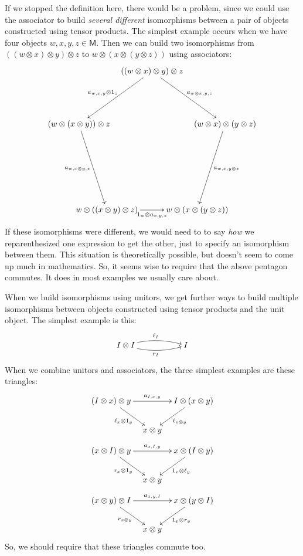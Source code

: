 \documentclass[reqno]{amsart}
\newcommand{\M}{{\mathsf{M}}}   %
\theoremstyle{definition}
\newcommand{\be}{\begin{equation}}
\newcommand{\ee}{\end{equation}}
\begin{document}
If we stopped the definition here, there would be a problem, since we could
use the associator to build \emph{several different} isomorphisms
between a pair of objects constructed using tensor products.  The simplest
example occurs when we have four objects $w,x,y,z \in \M$.  Then we can
build two isomorphisms from $((w \otimes x) \otimes y) \otimes z$ to $w \otimes (x \otimes (y \otimes z))$ using associators:
\be
\xy 0;/r.3pc/:
    (-24.73,8.03)*+{ (w \otimes (x \otimes y)) \otimes z}="l";
    (0,26)*+{ ((w \otimes x) \otimes y) \otimes z}="t";
    (24.73,8.03)*+{ (w \otimes x) \otimes (y \otimes z)}="r";
    (15.28,-21.03)*+{ w \otimes (x \otimes (y \otimes z))}="br";
    (-15.28,-21.03)*+{ w \otimes ((x \otimes y) \otimes z)}="bl";
     {\ar_{a_{w, x, y} \otimes 1_z} "t";"l"};
     {\ar_{a_{w, x \otimes y, z}} "l";"bl"};
     {\ar_{1_w \otimes a_{x,y,z}} "bl";"br"};
     {\ar^{a_{w, x, y \otimes z}} "r";"br"};
     {\ar^{a_{w \otimes x, y, z}} "t";"r"};
\endxy
\label{pentagon}
\ee
If these isomorphisms were different, we would need to to say \emph{how} we reparenthesized one expression to get the other, just to specify an isomorphism between them.  This situation is theoretically possible, but doesn't seem to come up much in mathematics.   So, it seems wise to require that the above pentagon commutes.  It does in most examples we usually care about.

When we build isomorphisms using unitors, we get further
ways to build multiple isomorphisms between objects constructed using tensor products and the unit object.  The simplest example is this:
\be 
\xymatrix{
I \otimes I   \ar@/^/[rr]^{\ell_I}  \ar@/_/[rr]_{r_I} && I
}  
\label{bigon}
\ee
When we combine unitors and associators, the three simplest examples are these triangles:
\be
\xy 0;/r.3pc/:
(-14,10)*+{(I \otimes x) \otimes y}="l";
(14,10)*+{ I \otimes (x \otimes y)}="r";
(0,0)*+{x \otimes y }="b";
 {\ar^{a_{I,x,y}} "l";"r"};
{\ar_{\ell_x \otimes 1_y} "l";"b"};
{\ar^{\ell_{x \otimes y}} "r";"b"};
\endxy    
\label{triangle1}
\ee
\be
\xy 0;/r.3pc/:
(-14,10)*+{(x \otimes I) \otimes y}="l";
(14,10)*+{x \otimes (I \otimes y)}="r";
(0,0)*+{x \otimes y }="b";
 {\ar^{a_{x,I,y}} "l";"r"};
{\ar_{r_x \otimes 1_y} "l";"b"};
{\ar^{1_x \otimes \ell_y} "r";"b"};
\endxy    
\label{triangle2}
\ee
\be
\xy 0;/r.3pc/:
(-14,10)*+{(x \otimes y) \otimes I}="l";
(14,10)*+{x \otimes (y \otimes I)}="r";
(0,0)*+{x \otimes y }="b";
 {\ar^{a_{x,y,I}} "l";"r"};
{\ar_{r_{x \otimes y}} "l";"b"};
{\ar^{1_x \otimes r_y} "r";"b"};
\endxy    
\label{triangle3}
\ee
So, we should require that these triangles commute too.
\end{document}
